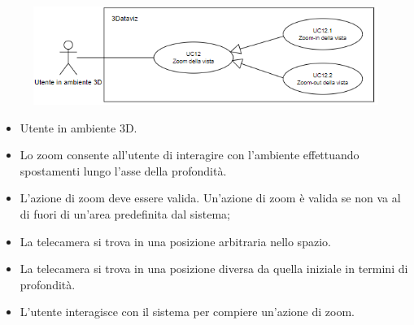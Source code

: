 \begin{figure}[h!]\centering
    \includegraphics[scale=0.8]{template/images/UC12.png}
    \caption{}
\end{figure}
\UCdsc
{ %
    \begin{itemize}
        \item Utente in ambiente 3D.
    \end{itemize}
}
{ %
    \begin{itemize}
        \item Lo zoom consente all'utente di interagire con l'ambiente effettuando spostamenti lungo l'asse della profondità.
    \end{itemize}
}
{ %
    \begin{itemize}
        \item L'azione di zoom deve essere valida. Un'azione di zoom è valida se non va al di fuori di un'area predefinita dal sistema;
        \item La telecamera si trova in una posizione arbitraria nello spazio.
    \end{itemize}
}
{ %
    \begin{itemize}
        \item La telecamera si trova in una posizione diversa da quella iniziale in termini di profondità.
    \end{itemize}
}
{ %
    \begin{itemize}
        \item L'utente interagisce con il sistema per compiere un'azione di zoom.
    \end{itemize}
} 

